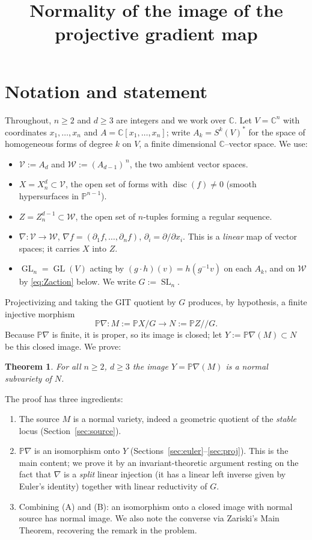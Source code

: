 \documentclass{amsart}
\newtheorem{theorem}{Theorem}
\theoremstyle{definition}
\DeclareMathOperator{\SL}{SL}
\DeclareMathOperator{\GL}{GL}
\DeclareMathOperator{\disc}{disc}
\newcommand{\PP}{\mathbb{P}}
\newcommand{\CC}{\mathbb{C}}
\newcommand{\nab}{\nabla}
\begin{document}
\title{Normality of the image of the projective gradient map}
\maketitle

\section{Notation and statement}

Throughout, $n\ge 2$ and $d\ge 3$ are integers and we work over $\CC$.
Let $V=\CC^n$ with coordinates $x_1,\dots,x_n$ and $A=\CC[x_1,\dots,x_n]$; write
$A_k=S^k(V)^{*}$ for the space of homogeneous forms of degree $k$ on $V$, a finite
dimensional $\CC$--vector space. We use:
\begin{itemize}
\item $\mathcal V:=A_d$ and $\mathcal W:=(A_{d-1})^{\,n}$, the two ambient vector spaces.
\item $X=X_n^d\subset \mathcal V$, the open set of forms with $\disc(f)\neq 0$ (smooth
hypersurfaces in $\PP^{n-1}$).
\item $Z=Z_n^{d-1}\subset \mathcal W$, the open set of $n$-tuples forming a regular sequence.
\item $\nab\colon \mathcal V\to \mathcal W$, $\nab f=(\partial_1 f,\dots,\partial_n f)$,
$\partial_i=\partial/\partial x_i$. This is a \emph{linear} map of vector spaces; it carries
$X$ into $Z$.
\item $\GL_n=\GL(V)$ acting by $(g\cdot h)(v)=h(g^{-1}v)$ on each $A_k$, and on $\mathcal W$
by \eqref{eq:Zaction} below. We write $G:=\SL_n$.
\end{itemize}

Projectivizing and taking the GIT quotient by $G$ produces, by hypothesis, a finite
injective morphism
\[
\PP\nab\colon M:=\PP X/G \longrightarrow N:=\PP Z/\!/G .
\]
Because $\PP\nab$ is finite, it is proper, so its image is closed; let
$Y:=\PP\nab(M)\subset N$ be this closed image. We prove:

\begin{theorem}\label{thm:main}
For all $n\ge 2$, $d\ge 3$ the image $Y=\PP\nab(M)$ is a normal subvariety of $N$.
\end{theorem}

The proof has three ingredients:
\begin{enumerate}
\item[(A)] The source $M$ is a normal variety, indeed a geometric quotient of the
\emph{stable} locus (Section~\ref{sec:source}).
\item[(B)] $\PP\nab$ is an isomorphism onto $Y$ (Sections~\ref{sec:euler}--\ref{sec:proj}).
This is the main content; we prove it by an invariant-theoretic argument resting on the fact
that $\nab$ is a \emph{split} linear injection (it has a linear left inverse given by Euler's
identity) together with linear reductivity of $G$.
\item[(C)] Combining (A) and (B): an isomorphism onto a closed image with normal source has
normal image. We also note the converse via Zariski's Main Theorem, recovering the remark in
the problem.
\end{enumerate}
\end{document}
